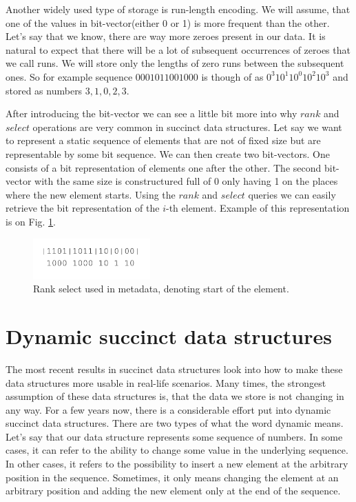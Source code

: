 Another widely used type of storage is run-length encoding. We will assume, that one of the values in bit-vector(either 0 or 1) is more frequent than the other. Let's say that we know, there are way more zeroes present in our data. It is natural to expect that there will be a lot of subsequent occurrences of zeroes that we call runs. We will store only the lengths of zero runs between the subsequent ones. So for example
sequence $0001011001000$ is though of as $0^{3}10^{1}10^{0}10^{2}10^{3}$ and stored as numbers $3, 1, 0, 2, 3$.

After introducing the bit-vector we can see a little bit more into why $rank$ and $select$ operations are very common in succinct data structures. Let say we want to represent a static sequence of elements that are not of fixed size but are representable by some bit sequence.
We can then create two bit-vectors. One consists of a bit representation of elements one after the other.
The second bit-vector with the same size is constructured full of 0 only having 1 on the places where the new element starts.
Using the $rank$ and $select$ queries we can easily retrieve the bit representation of the $i$-th element.
Example of this representation is on Fig. \ref{obr:obr_rank_select}.

\begin{figure}
\centerline{\includegraphics[width=0.4\textwidth]{images/obr_rank_select}}
\caption[Rank select usage in representation of sequence of elements with different size]{Rank select used in metadata, denoting start of the element.}
\label{obr:obr_rank_select}
\end{figure}

\section{Dynamic succinct data structures}

The most recent results in succinct data structures look into how to make these data structures more usable in real-life scenarios. Many times, the
strongest assumption of these data structures is, that the data we store is not changing in any way. For a few years now, there is a considerable effort put into dynamic succinct data structures. There are two types of what the word dynamic means. Let's say that our data structure represents some sequence of numbers. In some cases, it can refer to the ability to change some value in the underlying sequence. In other cases, it refers to the possibility to insert a new element at the arbitrary position in the sequence. Sometimes, it only means changing the element at an arbitrary position and adding the new element only at the end of the sequence.

